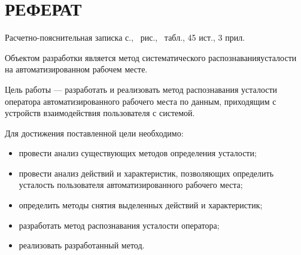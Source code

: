 \section*{РЕФЕРАТ}

Расчетно-пояснительная записка \pageref{LastPage} с., \totalfigures\ рис., \totaltables\ табл., 45 ист., 3 прил.

Объектом разработки является метод систематического распознавания\newline усталости на автоматизированном рабочем месте.

Цель работы --- разработать и реализовать метод распознавания усталости оператора автоматизированного рабочего места по данным, приходящим с устройств взаимодействия пользователя с системой.

Для достижения поставленной цели необходимо:
\begin{itemize}
\item провести анализ существующих методов определения усталости;
\item провести анализ действий и характеристик, позволяющих определить ус\-талость пользователя автоматизированного рабочего места;
\item определить методы снятия выделенных действий и характеристик;
\item разработать метод распознавания усталости оператора;
\item реализовать разработанный метод.
\end{itemize}

\pagebreak
